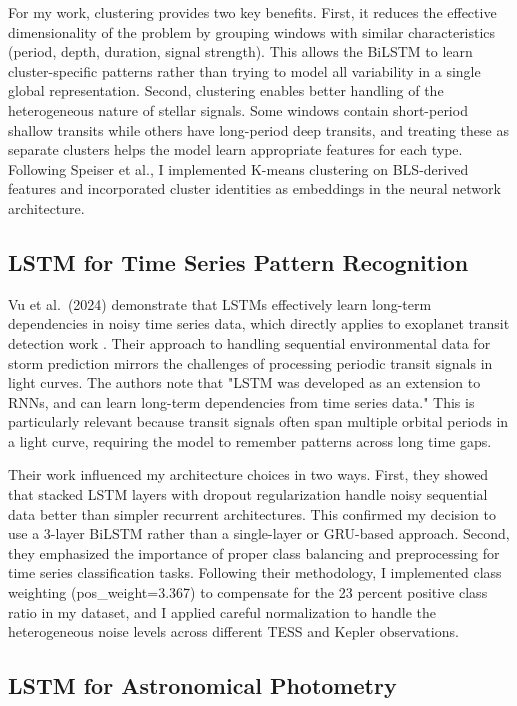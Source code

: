 \documentclass[letterpaper]{article}
\begin{document}
For my work, clustering provides two key benefits. First, it reduces the effective dimensionality of the problem by grouping windows with similar characteristics (period, depth, duration, signal strength). This allows the BiLSTM to learn cluster-specific patterns rather than trying to model all variability in a single global representation. Second, clustering enables better handling of the heterogeneous nature of stellar signals. Some windows contain short-period shallow transits while others have long-period deep transits, and treating these as separate clusters helps the model learn appropriate features for each type. Following Speiser et al., I implemented K-means clustering on BLS-derived features and incorporated cluster identities as embeddings in the neural network architecture.

\subsection{LSTM for Time Series Pattern Recognition}

Vu et al.\ (2024) demonstrate that LSTMs effectively learn long-term dependencies in noisy time series data, which directly applies to exoplanet transit detection work \cite{Vu2024LSTM}. Their approach to handling sequential environmental data for storm prediction mirrors the challenges of processing periodic transit signals in light curves. The authors note that "LSTM was developed as an extension to RNNs, and can learn long-term dependencies from time series data." This is particularly relevant because transit signals often span multiple orbital periods in a light curve, requiring the model to remember patterns across long time gaps.

Their work influenced my architecture choices in two ways. First, they showed that stacked LSTM layers with dropout regularization handle noisy sequential data better than simpler recurrent architectures. This confirmed my decision to use a 3-layer BiLSTM rather than a single-layer or GRU-based approach. Second, they emphasized the importance of proper class balancing and preprocessing for time series classification tasks. Following their methodology, I implemented class weighting (pos\_weight=3.367) to compensate for the 23 percent positive class ratio in my dataset, and I applied careful normalization to handle the heterogeneous noise levels across different TESS and Kepler observations.

\subsection{LSTM for Astronomical Photometry}
\end{document}
